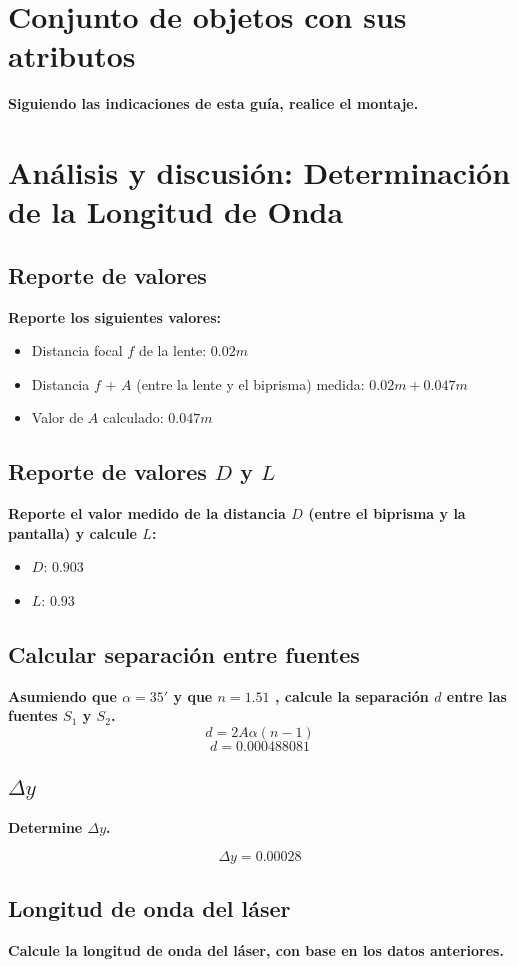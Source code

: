 \section{Conjunto de objetos con sus atributos}
\textbf{Siguiendo las indicaciones de esta guía, realice el montaje.}

\section{Análisis y discusión: Determinación de la Longitud de Onda}

\subsection{Reporte de valores}
\textbf{Reporte los siguientes valores:}
\begin{itemize}
  \item Distancia focal $f$ de la lente: $0.02m$
  \item Distancia $f$ $+$ $A$ (entre la lente y el biprisma) medida: $0.02m + 0.047m$
  \item Valor de $A$ calculado: $0.047m$
\end{itemize}

\subsection{Reporte de valores $D$ y $L$}
\textbf{Reporte el valor medido de la distancia $D$ (entre el biprisma y la pantalla) y calcule $L$:}
\begin{itemize}
  \item $D$: $0.903$
  \item $L$: $0.93$
\end{itemize}

\subsection{Calcular separación entre fuentes}
\textbf{Asumiendo que $\alpha = 35\prime$ y que $n = 1.51$ , calcule la
separación $d$ entre las fuentes $S_{1}$ y $S_{2}$.}
\[ d = 2A\alpha(n-1) \]
\[ d = 0.000488081 \]

\subsection{$\Delta$$y$}
\textbf{Determine $\Delta$$y$.}

\[ \Delta y = 0.00028 \]


\subsection{Longitud de onda del láser}
\textbf{Calcule la longitud de onda del láser, con base en los datos anteriores.}

